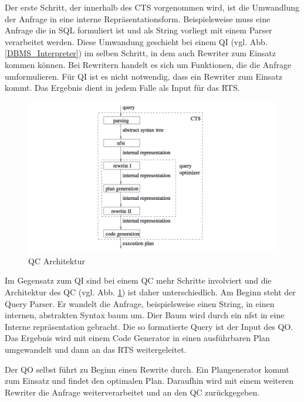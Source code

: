 Der erste Schritt, der innerhalb des \ac{CTS} vorgenommen wird, ist die Umwandlung der Anfrage in eine interne Repräsentationsform. Beispielsweise muss eine Anfrage die in \ac{SQL} formuliert ist und als String vorliegt mit einem Parser verarbeitet werden. Diese Umwandung geschieht bei einem \ac{QI} (vgl. Abb. \ref{DBMS_Interpreter})  im selben Schritt, in dem auch Rewriter zum Einsatz kommen können. Bei Rewritern handelt es sich um Funktionen, die die Anfrage umformulieren. Für \ac{QI} ist es nicht notwendig, dass ein Rewriter zum Einsatz kommt. Das Ergebnis dient in jedem Falle als Input für das \ac{RTS}.


\begin{figure}[h]
  \centering
  \includegraphics[width=\textwidth]{02_Grundlagen/QC_Architecture.png}
  \caption{\ac{QC} Architektur}
  \label{QC_Architecture}
\end{figure}

Im Gegensatz zum \ac{QI} sind bei einem \ac{QC} mehr Schritte involviert und die Architektur des \ac{QC} (vgl. Abb. \ref{QC_Architecture}) ist daher unterschiedlich. Am Beginn steht der Query Parser. Er wandelt die Anfrage, beispielsweise einen String, in einen internen, abstrakten Syntax baum um. Dier Baum wird durch ein nfst in eine Interne repräsentation gebracht. Die so formatierte Query ist der Input des \ac{QO}. Das Ergebnis wird mit einem Code Generator in einen ausführbaren Plan umgewandelt und dann an das \ac{RTS} weitergeleitet.

Der \ac{QO} selbst führt zu Beginn einen Rewrite durch. Ein Plangenerator kommt zum Einsatz und findet den optimalen Plan. Daraufhin wird mit einem weiteren Rewriter die Anfrage weiterverarbeitet und an den \ac{QC} zurückgegeben.
